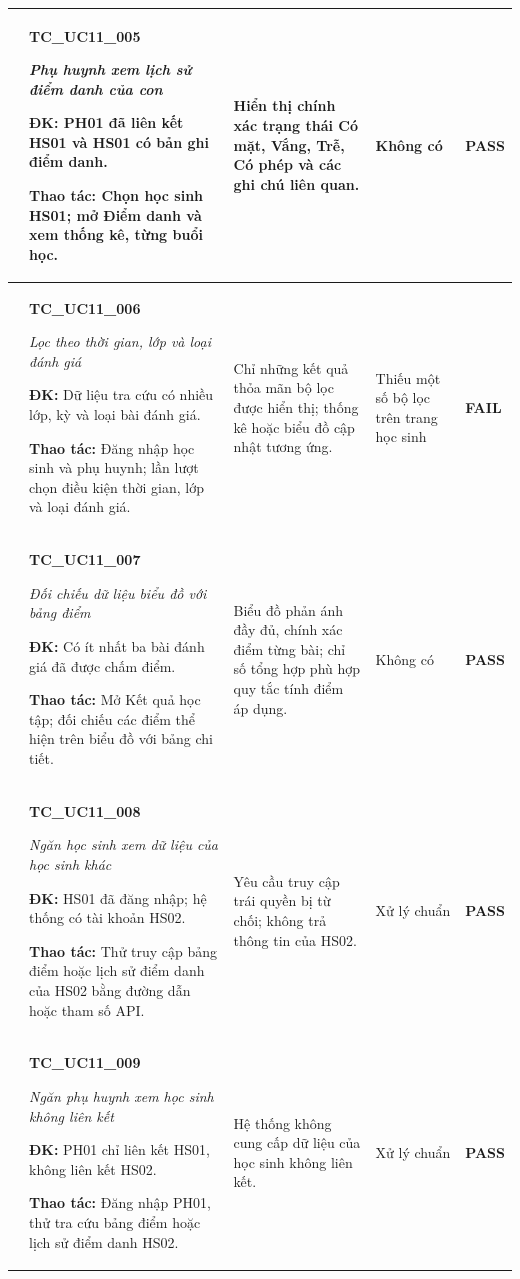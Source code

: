 \begin{longtable}{|>{\centering\arraybackslash}p{0.8cm}|>{\raggedright\arraybackslash}p{4.6cm}|>{\raggedright\arraybackslash}p{3.8cm}|>{\raggedright\arraybackslash}p{3.8cm}|>{\centering\arraybackslash}p{1.5cm}|}
5 & \textbf{TC\_UC11\_005}\par \textit{Phụ huynh xem lịch sử điểm danh của con}\par \textbf{ĐK:} PH01 đã liên kết HS01 và HS01 có bản ghi điểm danh.\par \textbf{Thao tác:} Chọn học sinh HS01; mở Điểm danh và xem thống kê, từng buổi học. & Hiển thị chính xác trạng thái Có mặt, Vắng, Trễ, Có phép và các ghi chú liên quan. & Không có & \textbf{PASS} \\ \hline
6 & \textbf{TC\_UC11\_006}\par \textit{Lọc theo thời gian, lớp và loại đánh giá}\par \textbf{ĐK:} Dữ liệu tra cứu có nhiều lớp, kỳ và loại bài đánh giá.\par \textbf{Thao tác:} Đăng nhập học sinh và phụ huynh; lần lượt chọn điều kiện thời gian, lớp và loại đánh giá. & Chỉ những kết quả thỏa mãn bộ lọc được hiển thị; thống kê hoặc biểu đồ cập nhật tương ứng. & Thiếu một số bộ lọc trên trang học sinh & \textbf{FAIL} \\ \hline
7 & \textbf{TC\_UC11\_007}\par \textit{Đối chiếu dữ liệu biểu đồ với bảng điểm}\par \textbf{ĐK:} Có ít nhất ba bài đánh giá đã được chấm điểm.\par \textbf{Thao tác:} Mở Kết quả học tập; đối chiếu các điểm thể hiện trên biểu đồ với bảng chi tiết. & Biểu đồ phản ánh đầy đủ, chính xác điểm từng bài; chỉ số tổng hợp phù hợp quy tắc tính điểm áp dụng. & Không có & \textbf{PASS} \\ \hline
8 & \textbf{TC\_UC11\_008}\par \textit{Ngăn học sinh xem dữ liệu của học sinh khác}\par \textbf{ĐK:} HS01 đã đăng nhập; hệ thống có tài khoản HS02.\par \textbf{Thao tác:} Thử truy cập bảng điểm hoặc lịch sử điểm danh của HS02 bằng đường dẫn hoặc tham số API. & Yêu cầu truy cập trái quyền bị từ chối; không trả thông tin của HS02. & Xử lý chuẩn & \textbf{PASS} \\ \hline
9 & \textbf{TC\_UC11\_009}\par \textit{Ngăn phụ huynh xem học sinh không liên kết}\par \textbf{ĐK:} PH01 chỉ liên kết HS01, không liên kết HS02.\par \textbf{Thao tác:} Đăng nhập PH01, thử tra cứu bảng điểm hoặc lịch sử điểm danh HS02. & Hệ thống không cung cấp dữ liệu của học sinh không liên kết. & Xử lý chuẩn & \textbf{PASS} \\ \hline

\end{longtable}
